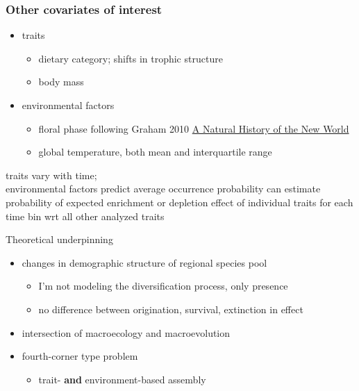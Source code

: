 \documentclass{beamer}
\begin{document}
\begin{frame}
  \frametitle{Other covariates of interest}
  \begin{itemize}
    \item traits
      \begin{itemize}
        \item dietary category; shifts in trophic structure 
        \item body mass
      \end{itemize}
    \item environmental factors
      \begin{itemize}
        \item floral phase following Graham 2010 \underline{A Natural History of the New World}
        \item global temperature, both mean and interquartile range
      \end{itemize}
  \end{itemize}

  \begin{block}{traits vary with time; \\environmental factors predict average occurrence probability}
    can estimate probability of expected enrichment or depletion effect of individual traits for each time bin wrt all other analyzed traits
  \end{block}
\end{frame}

\begin{frame}
  \begin{block}{Theoretical underpinning}
    \begin{itemize}
      \item changes in demographic structure of regional species pool
        \begin{itemize}
          \item I'm not modeling the diversification process, \alert{only presence}
          \item no difference between origination, survival, extinction in effect
        \end{itemize}
      \item intersection of macroecology and macroevolution
      \item fourth-corner type problem
        \begin{itemize}
          \item trait- \textbf{and} environment-based assembly
        \end{itemize}
    \end{itemize}
  \end{block}
\end{frame}
\end{document}
